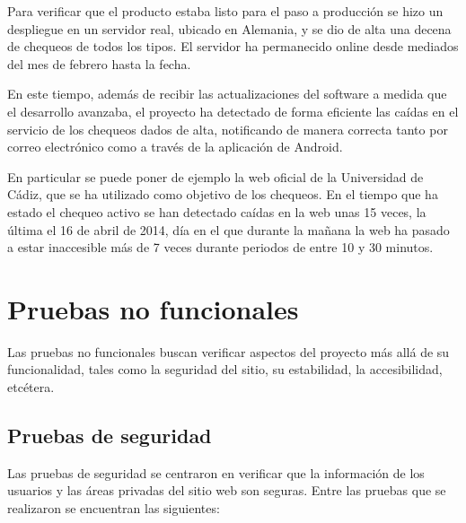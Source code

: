 Para verificar que el producto estaba listo para el paso a producción se hizo un
despliegue en un servidor real, ubicado en Alemania, y se dio de alta una decena
de chequeos de todos los tipos. El servidor ha permanecido online desde mediados
del mes de febrero hasta la fecha.

En este tiempo, además de recibir las actualizaciones del software a medida que
el desarrollo avanzaba, el proyecto ha detectado de forma eficiente las caídas
en el servicio de los chequeos dados de alta, notificando de manera correcta
tanto por correo electrónico como a través de la aplicación de Android.

En particular se puede poner de ejemplo la web oficial de la Universidad de
Cádiz, que se ha utilizado como objetivo de los chequeos. En el tiempo que ha
estado el chequeo activo se han detectado caídas en la web unas 15 veces, la
última el 16 de abril de 2014, día en el que durante la mañana la web ha pasado
a estar inaccesible más de 7 veces durante periodos de entre 10 y 30 minutos.


\section{Pruebas no funcionales}

Las pruebas no funcionales buscan verificar aspectos del proyecto más allá de su
funcionalidad, tales como la seguridad del sitio, su estabilidad, la
accesibilidad, etcétera.

\subsection{Pruebas de seguridad}

Las pruebas de seguridad se centraron en verificar que la información de los
usuarios y las áreas privadas del sitio web son seguras. Entre las pruebas que
se realizaron se encuentran las siguientes:

